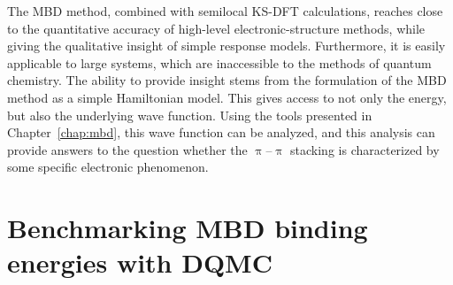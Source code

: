 The MBD method, combined with semilocal KS-DFT calculations, reaches close to the quantitative accuracy of high-level electronic-structure methods, while giving the qualitative insight of simple response models.
Furthermore, it is easily applicable to large systems, which are inaccessible to the methods of quantum chemistry.
The ability to provide insight stems from the formulation of the MBD method as a simple Hamiltonian model.
This gives access to not only the energy, but also the underlying wave function.
Using the tools presented in Chapter~\ref{chap:mbd}, this wave function can be analyzed, and this analysis can provide answers to the question whether the $\uppi$--$\uppi$ stacking is characterized by some specific electronic phenomenon.

\section{Benchmarking MBD binding energies with DQMC}


